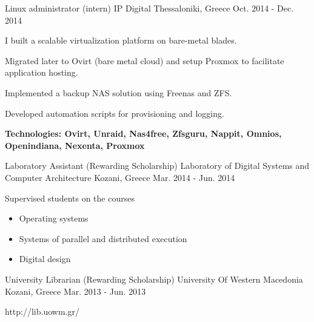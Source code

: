 \begin{cventries}

\cventry
{Linux administrator (intern)} %
{IP Digital} %
{Thessaloniki, Greece} %
{Oct. 2014 - Dec. 2014} %
{ %
\begin{cvitems}
\item {I built a scalable virtualization platform on bare-metal blades.}
\item {Migrated later to Ovirt (bare metal cloud) and setup Proxmox to facilitate application hosting.}
\item {Implemented a backup NAS solution using Freenas and ZFS.}
\item {Developed automation scripts for provisioning and logging.}
\item {\bfseries{Technologies:} Ovirt, Unraid, Nas4free, Zfsguru, Nappit, Omnios, Openindiana, Nexenta, Proxmox}
\end{cvitems}
}


\cventry
{Laboratory Assistant (Rewarding Scholarship)} %
{Laboratory of Digital Systems and Computer Architecture} %
{Kozani, Greece} %
{Mar. 2014 - Jun. 2014} %
{ %
\begin{cvitems}
\item {Supervised students on the courses}
\begin{itemize}
\item {Operating systems}
\item {Systems of parallel and distributed execution}
\item {Digital design}
\end{itemize}
\end{cvitems}
}


\cventry
{University Librarian (Rewarding Scholarship)} %
{University Of Western Macedonia} %
{Kozani, Greece} %
{Mar. 2013 - Jun. 2013} %
{ %
\begin{cvitems}
\item {http://lib.uowm.gr/}
\end{cvitems}
}


\end{cventries}

